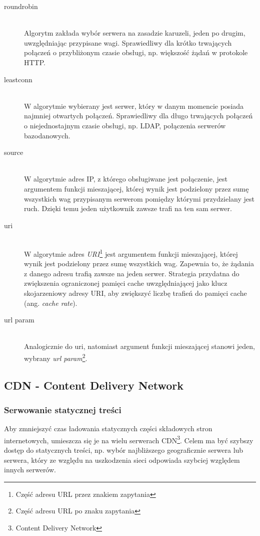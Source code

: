 \begin{description}
  \item[roundrobin] \hfill \\
  Algorytm zakłada wybór serwera na zasadzie karuzeli, jeden po drugim, uwzględniając przypisane wagi. Sprawiedliwy dla krótko trwających połączeń o przybliżonym czasie obsługi, np. większość żądań w protokole HTTP.
  \item[leastconn] \hfill \\
  W algorytmie wybierany jest serwer, który w danym momencie posiada najmniej otwartych połączeń. Sprawiedliwy dla długo trwających połączeń o niejednostajnym czasie obsługi, np. LDAP, połączenia serwerów bazodanowych.
  \item[source] \hfill \\
  W algorytmie adres IP, z którego obsługiwane jest połączenie, jest argumentem funkcji mieszającej, której wynik jest podzielony przez sumę wszystkich wag przypisanym serwerom pomiędzy którymi przydzielany jest ruch. Dzięki temu jeden użytkownik zawsze trafi na ten sam serwer.
  \item[uri] \hfill \\
  W algorytmie adres \emph{URI}\footnote{Część adresu URL przez znakiem zapytania} jest argumentem funkcji mieszającej, której wynik jest podzielony przez sumę wszystkich wag. Zapewnia to, że żądania z danego adresu trafią zawsze na jeden serwer. Strategia przydatna do zwiększenia ograniczonej pamięci cache uwzględniającej jako klucz skojarzeniowy adresy URI, aby zwiększyć liczbę trafień do pamięci cache (ang. \emph{cache rate}).
  \item[url param] \hfill \\
  Analogicznie do uri, natomiast argument funkcji mieszającej stanowi jeden, wybrany \emph{url param}\footnote{Część adresu URL po znaku zapytania}.
\end{description}

\subsection{CDN - Content Delivery Network}
\label{subsub:cdn}

\subsubsection{Serwowanie statycznej treści}

Aby zmniejszyć czas ładowania statycznych części składowych stron internetowych, umieszcza się je na wielu serwerach CDN\footnote{Content Delivery Network}. Celem ma być szybszy dostęp do statycznych treści, np. wybór najbliższego geograficznie serwera lub serwera, który ze względu na uszkodzenia sieci odpowiada szybciej względem innych serwerów.

